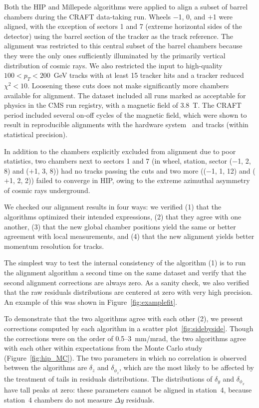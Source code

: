 Both the HIP and Millepede algorithms were applied to align a subset
of barrel chambers during the CRAFT
data-taking run.  Wheels $-$1, 0, and $+$1 were aligned, with the
exception of sectors 1 and 7 (extreme horizontal sides of the
detector) using the barrel section of the tracker as the track
reference.  The alignment was restricted to this central subset of the
barrel chambers because they were the only ones sufficiently
illuminated by the primarily vertical distribution of cosmic rays.  We
also restricted the input to high-quality $100 < p_T < 200$~GeV tracks
with at least 15 tracker hits and a tracker reduced $\chi^2 < 10$.
Loosening these cuts does not make significantly more chambers
available for alignment.  The dataset included all runs marked as acceptable for
physics in the CMS run registry, with a magnetic field of 3.8~T.  The
CRAFT period included several on-off cycles of the magnetic field,
which were shown to result in reproducible alignments with the
hardware system~\cite{ref:hardware_alignment} and tracks (within
statistical precision).

In addition to the chambers explicitly excluded from alignment due to
poor statistics, two chambers next to sectors 1 and 7 (in wheel,
station, sector ($-$1, 2, 8) and ($+$1, 3, 8)) had no tracks passing
the cuts and two more (($-$1, 1, 12) and ($+$1, 2, 2)) failed to
converge in HIP, owing to the extreme azimuthal asymmetry of cosmic
rays underground.

We checked our alignment results in four ways: we verified (1) that
the algorithms optimized their intended expressions, (2) that they
agree with one another, (3) that the new global chamber positions yield the same or
better agreement with local measurements, and (4) that the new
alignment yields better momentum resolution for tracks.

The simplest way to test the internal consistency of the algorithm (1)
is to run the alignment algorithm a second time on the same dataset
and verify that the second alignment corrections are always zero.  As
a sanity check, we also verified that the raw residuals distributions
are centered at zero with very high precision.  An example of this was
shown in Figure~\ref{fig:examplefit}.

To demonstrate that the two algorithms agree with each other (2), we
present corrections computed by each algorithm in a scatter
plot~\ref{fig:sidebyside}.  Though the corrections were on the order
of 0.5--3~mm/mrad, the two algorithms agree with each other within
expectations from the Monte Carlo study (Figure~\ref{fig:hip_MC}).  The
two parameters in which no correlation is observed between the
algorithms are $\delta_z$ and $\delta_{\phi_z}$, which are the most
likely to be affected by the treatment of tails in residuals
distributions.  The distributions of $\delta_y$ and $\delta_{\phi_x}$
have tall peaks at zero: these parameters cannot be aligned in
station~4, because station~4 chambers do not measure $\Delta y$
residuals.

